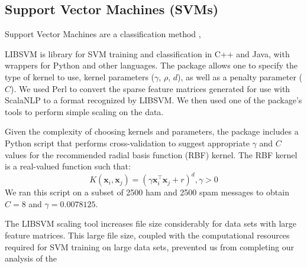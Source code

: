 \documentclass[preprint]{acm_proc_article-sp}
\begin{document}
\subsection{Support Vector Machines (SVMs)}


Support Vector Machines are a classification method  \cite{boser}, \cite{cortesv95} 



LIBSVM is library for SVM training and classification in C++ and Java, with wrappers for Python and other languages. The package allows one to specify the type of kernel to use, kernel parameters ($\gamma$, $\rho$, $d$), as well as a penalty parameter ($C$). We used Perl to convert the sparse feature matrices generated for use with ScalaNLP to a format recognized by LIBSVM. We then used one of the package's tools to perform simple scaling on the data. 

Given the complexity of choosing kernels and parameters, the package includes a Python script that performs cross-validation to suggest appropriate $\gamma$ and $C$ values for the recommended radial basis function (RBF) kernel. The RBF kernel is a real-valued function such that: $$K(\mathbf{x}_i, \mathbf{x}_j) = (\gamma\mathbf{x}_i^\intercal\mathbf{x}_j+r)^d, \gamma>0$$
We ran this script on a subset of 2500 ham and 2500 spam messages to obtain $C = 8$ and $\gamma = 0.0078125$.

The LIBSVM scaling tool increases file size considerably for data sets with large feature matrices. This large file size, coupled with the computational resources required for SVM training on large data sets, prevented us from completing our analysis of the 

%
%
%
\end{document}
